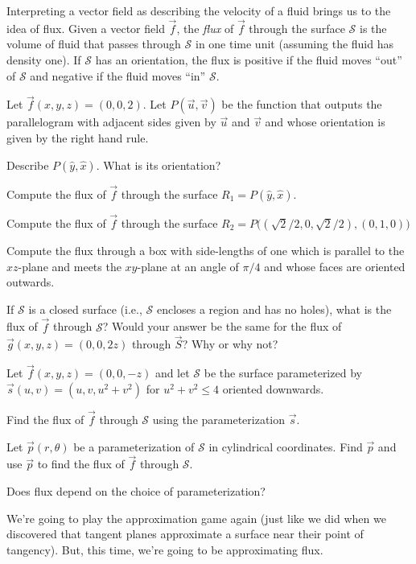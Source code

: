\documentclass{problemset}
\begin{document}
	Interpreting a vector field as describing the velocity of a fluid brings
	us to the idea of flux.  Given a vector field $\vec f$,
	the \emph{flux} of $\vec f$ through the surface $\mathcal S$ is the volume of fluid
	that passes through $\mathcal S$ in one time unit (assuming the fluid has density one).
	If $\mathcal S$ has an orientation, the flux is positive if the fluid moves ``out''
	of $\mathcal S$ and negative if the fluid moves ``in'' $\mathcal S$.

	\question
	Let $\vec f(x,y,z)=(0,0,2)$.  Let $P(\vec u,\vec v)$ be the function
	that outputs the parallelogram with adjacent sides given by $\vec u$ and
	$\vec v$ and whose orientation is given by the right hand rule.
	\begin{parts}
		\item Describe $P(\hat y, \hat x)$.  What is its orientation?
		\item Compute the flux of $\vec f$ through the surface $R_1= P(\hat y, \hat x)$.
		\item Compute the flux of $\vec f$ through the surface $R_2=
			P\Big( (\sqrt{2}/2,0,\sqrt{2}/2), (0,1,0) \Big)$
		\item Compute the flux through a box with side-lengths of one which
			is parallel to the $xz$-plane and meets the $xy$-plane at an
			angle of $\pi/4$ and whose faces are oriented outwards.
		\item If $\mathcal S$ is a closed surface (i.e., $\mathcal S$ encloses
			a region and has no holes), what is the flux of
			$\vec f$ through $\mathcal S$?  Would your
			answer be the same for the flux of $\vec g(x,y,z)=(0,0,2z)$
			through $\vec S$?  Why or why not?
	\end{parts}

	\question
	Let $\vec f(x,y,z)=(0,0,-z)$ and let $\mathcal S$ be the surface
	parameterized by $\vec s(u,v) = (u,v,u^2+v^2)$ for $u^2+v^2\leq 4$ oriented
	downwards.
	\begin{parts}
		\item Find the flux of $\vec f$ through $\mathcal S$ using the parameterization $\vec s$.
		\item Let $\vec p(r,\theta)$ be a parameterization of $\mathcal S$
			in cylindrical coordinates.  Find $\vec p$ and use $\vec p$
			to find the flux of $\vec f$ through $\mathcal S$.
		\item Does flux depend on the choice of parameterization?
	\end{parts}

	We're going to play the approximation game again (just like
	we did when we discovered that tangent planes approximate a surface
	near their point of tangency). But, this time, we're going
	to be approximating flux.
\end{document}
